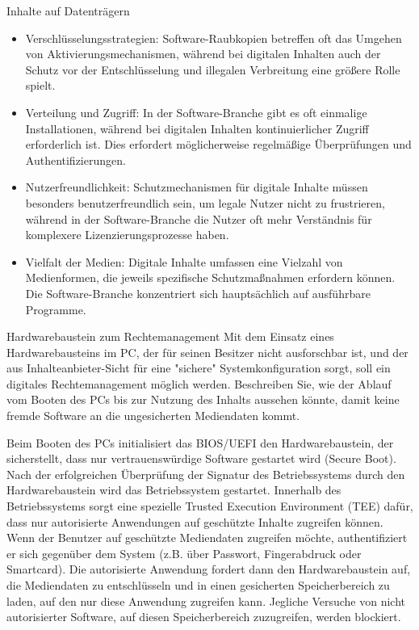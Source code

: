 \documentclass{article}
\begin{document}
\begin{exercise}[1]{Inhalte auf Datenträgern}
\begin{solution}
\begin{enumerate}
\begin{itemize}
              \item Verschlüsselungsstrategien: Software-Raubkopien betreffen oft das Umgehen von Aktivierungsmechanismen, während bei digitalen Inhalten auch der Schutz vor der Entschlüsselung und illegalen Verbreitung eine größere Rolle spielt.
              \item Verteilung und Zugriff: In der Software-Branche gibt es oft einmalige Installationen, während bei digitalen Inhalten kontinuierlicher Zugriff erforderlich ist. Dies erfordert möglicherweise regelmäßige Überprüfungen und Authentifizierungen.
              \item Nutzerfreundlichkeit: Schutzmechanismen für digitale Inhalte müssen besonders benutzerfreundlich sein, um legale Nutzer nicht zu frustrieren, während in der Software-Branche die Nutzer oft mehr Verständnis für komplexere Lizenzierungsprozesse haben.
              \item Vielfalt der Medien: Digitale Inhalte umfassen eine Vielzahl von Medienformen, die jeweils spezifische Schutzmaßnahmen erfordern können. Die Software-Branche konzentriert sich hauptsächlich auf ausführbare Programme.
            \end{itemize}
    \end{enumerate}
  \end{solution}
\end{exercise}

\begin{exercise}{Hardwarebaustein zum Rechtemanagement}
  Mit dem Einsatz eines Hardwarebausteins im PC, der für seinen Besitzer nicht ausforschbar ist, und der aus Inhalteanbieter-Sicht für eine "sichere" Systemkonfiguration sorgt, soll ein digitales Rechtemanagement möglich werden. Beschreiben Sie, wie der Ablauf vom Booten des PCs bis zur Nutzung des Inhalts aussehen könnte, damit keine fremde Software an die ungesicherten Mediendaten kommt.

  \begin{solution}
    Beim Booten des PCs initialisiert das BIOS/UEFI den Hardwarebaustein, der sicherstellt, dass nur vertrauenswürdige Software gestartet wird (Secure Boot). Nach der erfolgreichen Überprüfung der Signatur des Betriebssystems durch den Hardwarebaustein wird das Betriebssystem gestartet. Innerhalb des Betriebssystems sorgt eine spezielle Trusted Execution Environment (TEE) dafür, dass nur autorisierte Anwendungen auf geschützte Inhalte zugreifen können. Wenn der Benutzer auf geschützte Mediendaten zugreifen möchte, authentifiziert er sich gegenüber dem System (z.B. über Passwort, Fingerabdruck oder Smartcard). Die autorisierte Anwendung fordert dann den Hardwarebaustein auf, die Mediendaten zu entschlüsseln und in einen gesicherten Speicherbereich zu laden, auf den nur diese Anwendung zugreifen kann. Jegliche Versuche von nicht autorisierter Software, auf diesen Speicherbereich zuzugreifen, werden blockiert.
  \end{solution}
\end{exercise}
\end{document}
